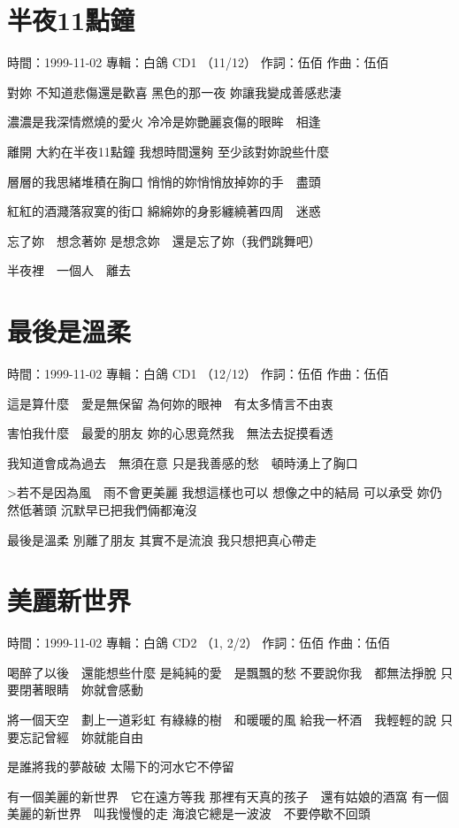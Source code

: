 \documentclass[UTF8,a4paper,oneside,twocolumn,12pt]{ctexbook}
\newcommand{\infopair}[2]{\textbullet #1：#2}
\newcommand{\zc}[1][伍佰]{\infopair{作詞}{#1}}
\newcommand{\zq}[1][伍佰]{\infopair{作曲}{#1}}
\newcommand{\zj}[1]{\infopair{專輯}{#1}}
\newcommand{\sj}[1]{\infopair{時間}{#1}}
\newenvironment{info}{\begin{flushleft}\kaishu
	}
	{\end{flushleft}\normalsize\yahei\par}
\newenvironment{lyric}{
	}
{}
\begin{document}
\section{半夜11點鐘}
\begin{info}
	\sj{1999-11-02}
	\zj{白鴿 CD1 （11/12）}
	\zc
	\zq
\end{info}
\begin{lyric}
	對妳
	不知道悲傷還是歡喜
	黑色的那一夜
	妳讓我變成善感悲淒

	濃濃是我深情燃燒的愛火
	冷冷是妳艷麗哀傷的眼眸　相逢

	離開
	大約在半夜11點鐘
	我想時間還夠
	至少該對妳說些什麼

	層層的我思緒堆積在胸口
	悄悄的妳悄悄放掉妳的手　盡頭

	紅紅的酒濺落寂寞的街口
	綿綿妳的身影纏繞著四周　迷惑

	忘了妳　想念著妳
	是想念妳　還是忘了妳（我們跳舞吧）

	半夜裡　一個人　離去
\end{lyric}

\section{最後是溫柔}
\begin{info}
	\sj{1999-11-02}
	\zj{白鴿 CD1 （12/12）}
	\zc
	\zq
\end{info}
\begin{lyric}
	這是算什麼　愛是無保留
	為何妳的眼神　有太多情言不由衷

	害怕我什麼　最愛的朋友
	妳的心思竟然我　無法去捉摸看透

	我知道會成為過去　無須在意
	只是我善感的愁　頓時湧上了胸口

	>若不是因為風　雨不會更美麗
	我想這樣也可以
	想像之中的結局
	可以承受
	妳仍然低著頭
	沉默早已把我們倆都淹沒

	最後是溫柔
	別離了朋友
	其實不是流浪
	我只想把真心帶走
\end{lyric}

\section{美麗新世界}
\begin{info}
	\sj{1999-11-02}
	\zj{白鴿 CD2 （1, 2/2）}
	\zc
	\zq
\end{info}
\begin{lyric}
	喝醉了以後　還能想些什麼
	是純純的愛　是飄飄的愁
	不要說你我　都無法掙脫
	只要閉著眼睛　妳就會感動

	將一個天空　劃上一道彩虹
	有綠綠的樹　和暖暖的風
	給我一杯酒　我輕輕的說
	只要忘記曾經　妳就能自由

	是誰將我的夢敲破
	太陽下的河水它不停留

	有一個美麗的新世界　它在遠方等我
	那裡有天真的孩子　還有姑娘的酒窩
	有一個美麗的新世界　叫我慢慢的走
	海浪它總是一波波　不要停歇不回頭
\end{lyric}
\end{document}

